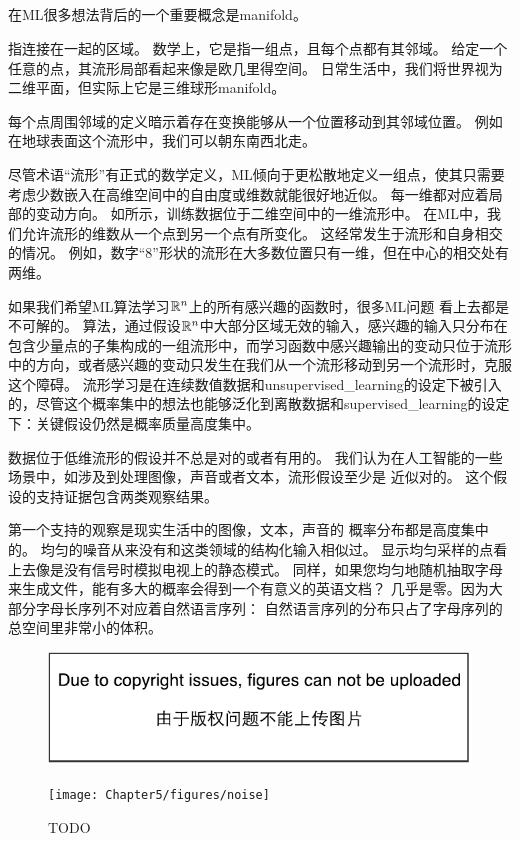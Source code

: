 
\subsection{}
\label{sec:manifold_learning}
在\gls{ML}很多想法背后的一个重要概念是\gls{manifold}。

指连接在一起的区域。
数学上，它是指一组点，且每个点都有其邻域。
给定一个任意的点，其流形局部看起来像是欧几里得空间。
日常生活中，我们将世界视为二维平面，但实际上它是三维球形\gls{manifold}。

每个点周围邻域的定义暗示着存在变换能够从一个位置移动到其邻域位置。
例如在地球表面这个流形中，我们可以朝东南西北走。

尽管术语“流形”有正式的数学定义，\gls{ML}倾向于更松散地定义一组点，使其只需要考虑少数嵌入在高维空间中的自由度或维数就能很好地近似。
每一维都对应着局部的变动方向。
如所示，训练数据位于二维空间中的一维流形中。
在\gls{ML}中，我们允许流形的维数从一个点到另一个点有所变化。
这经常发生于流形和自身相交的情况。
例如，数字“8”形状的流形在大多数位置只有一维，但在中心的相交处有两维。

如果我们希望\gls{ML}算法学习$\mathbb{R}^n$上的所有感兴趣的函数时，很多\gls{ML}问题
看上去都是不可解的。
算法，通过假设$\mathbb{R}^n$中大部分区域无效的输入，感兴趣的输入只分布在包含少量点的子集构成的一组流形中，而学习函数中感兴趣输出的变动只位于流形中的方向，或者感兴趣的变动只发生在我们从一个流形移动到另一个流形时，克服这个障碍。
流形学习是在连续数值数据和\gls{unsupervised_learning}的设定下被引入的，尽管这个概率集中的想法也能够泛化到离散数据和\gls{supervised_learning}的设定下：关键假设仍然是概率质量高度集中。


数据位于低维流形的假设并不总是对的或者有用的。
我们认为在人工智能的一些场景中，如涉及到处理图像，声音或者文本，流形假设至少是
近似对的。
这个假设的支持证据包含两类观察结果。

第一个支持的观察是现实生活中的图像，文本，声音的
概率分布都是高度集中的。
均匀的噪音从来没有和这类领域的结构化输入相似过。
显示均匀采样的点看上去像是没有信号时模拟电视上的静态模式。
同样，如果您均匀地随机抽取字母来生成文件，能有多大的概率会得到一个有意义的英语文档？
几乎是零。因为大部分字母长序列不对应着自然语言序列：
自然语言序列的分布只占了字母序列的总空间里非常小的体积。

\begin{figure}[!htb]
\ifOpenSource
\centerline{\includegraphics{figure.pdf}}
\else
\centerline{\texttt{[image: Chapter5/figures/noise]}}
\fi
\caption{TODO}
\label{fig:chap5_noise}
\end{figure}

